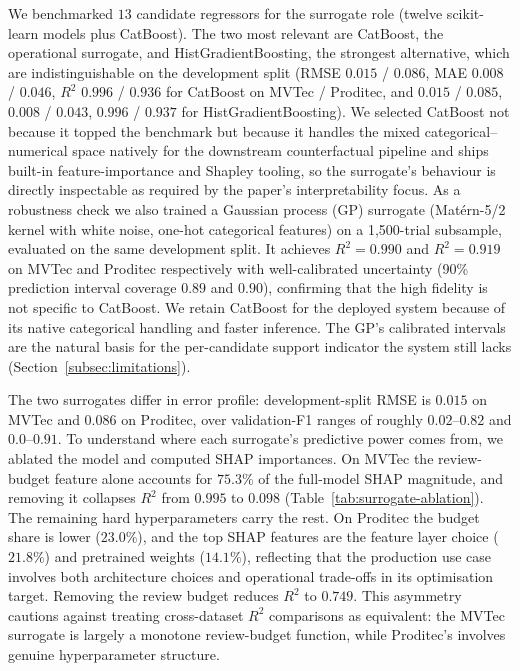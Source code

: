 \documentclass[final,5p,times,twocolumn]{elsarticle}
\begin{document}
We benchmarked $13$ candidate regressors for the surrogate role
(twelve scikit-learn \cite{pedregosa_scikit-learn_2011} models plus CatBoost). The two most relevant are CatBoost, the operational surrogate, and HistGradientBoosting, the strongest alternative, which are indistinguishable on the development split (RMSE $0.015$ / $0.086$, MAE $0.008$ / $0.046$, $R^2$ $0.996$ / $0.936$ for CatBoost on MVTec / Proditec, and $0.015$ / $0.085$, $0.008$ / $0.043$, $0.996$ / $0.937$ for HistGradientBoosting). We selected CatBoost not
because it topped the benchmark but because it handles the mixed
categorical--numerical space natively for the downstream
counterfactual pipeline and ships built-in feature-importance and
Shapley tooling, so the surrogate's behaviour is directly inspectable
as required by the paper's interpretability focus. As a robustness check we also trained a Gaussian process (GP) surrogate (Mat\'ern-5/2 kernel with white noise, one-hot categorical features) on a 1,500-trial subsample, evaluated on the same development split. It achieves $R^2 = 0.990$ and $R^2 = 0.919$ on MVTec and
Proditec respectively with well-calibrated uncertainty (90\% prediction
interval coverage $0.89$ and $0.90$), confirming that the high fidelity
is not specific to CatBoost. We retain CatBoost for the deployed system
because of its native categorical handling and faster inference. The GP's calibrated intervals are the natural basis for the per-candidate
support indicator the system still lacks (Section~\ref{subsec:limitations}).





The two surrogates differ in error profile: development-split RMSE is $0.015$ on MVTec and $0.086$ on Proditec, over validation-F1 ranges of roughly $0.02$--$0.82$ and $0.0$--$0.91$. To understand where each surrogate's predictive power comes from, we ablated the model and computed SHAP importances.
On MVTec the review-budget feature alone accounts for $75.3\%$ of the
full-model SHAP magnitude, and removing it collapses $R^2$ from $0.995$ to $0.098$ (Table~\ref{tab:surrogate-ablation}). The remaining hard hyperparameters carry the rest. On Proditec the budget
share is lower ($23.0\%$), and the top SHAP features are the feature
layer choice ($21.8\%$) and pretrained weights ($14.1\%$), reflecting
that the production use case involves both architecture choices and
operational trade-offs in its optimisation target. Removing the review budget reduces $R^2$ to $0.749$. This asymmetry cautions
against treating cross-dataset $R^2$ comparisons as equivalent: the
MVTec surrogate is largely a monotone review-budget function, while
Proditec's involves genuine hyperparameter structure.
\end{document}
